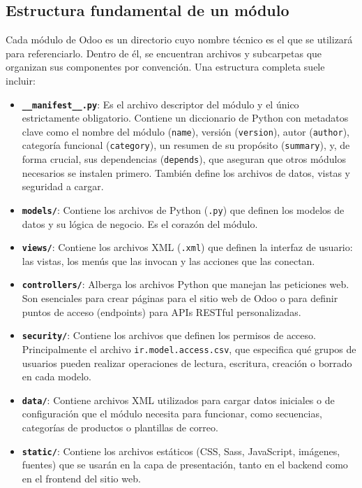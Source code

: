 \documentclass[12pt,letterpaper,spanish]{report}
\begin{document}
\subsection{Estructura fundamental de un módulo}
\label{sub:estructura_modulo}
Cada módulo de Odoo es un directorio cuyo nombre técnico es el que se utilizará para referenciarlo. Dentro de él, se encuentran archivos y subcarpetas que organizan sus componentes por convención. Una estructura completa suele incluir:
\begin{itemize}
    \item \textbf{\texttt{\_\_manifest\_\_.py}}: Es el archivo descriptor del módulo y el único estrictamente obligatorio. Contiene un diccionario de Python con metadatos clave como el nombre del módulo (\texttt{name}), versión (\texttt{version}), autor (\texttt{author}), categoría funcional (\texttt{category}), un resumen de su propósito (\texttt{summary}), y, de forma crucial, sus dependencias (\texttt{depends}), que aseguran que otros módulos necesarios se instalen primero. También define los archivos de datos, vistas y seguridad a cargar.

    \item \textbf{\texttt{models/}}: Contiene los archivos de Python (\texttt{.py}) que definen los modelos de datos y su lógica de negocio. Es el corazón del módulo.

    \item \textbf{\texttt{views/}}: Contiene los archivos XML (\texttt{.xml}) que definen la interfaz de usuario: las vistas, los menús que las invocan y las acciones que las conectan.

    \item \textbf{\texttt{controllers/}}: Alberga los archivos Python que manejan las peticiones web. Son esenciales para crear páginas para el sitio web de Odoo o para definir puntos de acceso (endpoints) para APIs RESTful personalizadas.

    \item \textbf{\texttt{security/}}: Contiene los archivos que definen los permisos de acceso. Principalmente el archivo \texttt{ir.model.access.csv}, que especifica qué grupos de usuarios pueden realizar operaciones de lectura, escritura, creación o borrado en cada modelo.

    \item \textbf{\texttt{data/}}: Contiene archivos XML utilizados para cargar datos iniciales o de configuración que el módulo necesita para funcionar, como secuencias, categorías de productos o plantillas de correo.

    \item \textbf{\texttt{static/}}: Contiene los archivos estáticos (CSS, Sass, JavaScript, imágenes, fuentes) que se usarán en la capa de presentación, tanto en el backend como en el frontend del sitio web.
\end{itemize}
\end{document}
